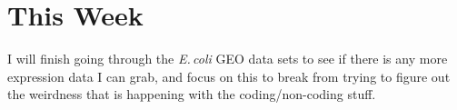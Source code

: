 \documentclass[12pt]{article}
\newcommand{\smel}{\textit{S.\,meliloti}\xspace}
\newcommand{\ecol}{\textit{E.\,coli}\xspace}
\newcommand{\pb}{pSymB\xspace}
\begin{document}



\section*{This Week}
I will finish going through the \ecol GEO data sets to see if there is any more expression data I can grab, and focus on this to break from trying to figure out the weirdness that is happening with the coding/non-coding stuff.
\end{document}
